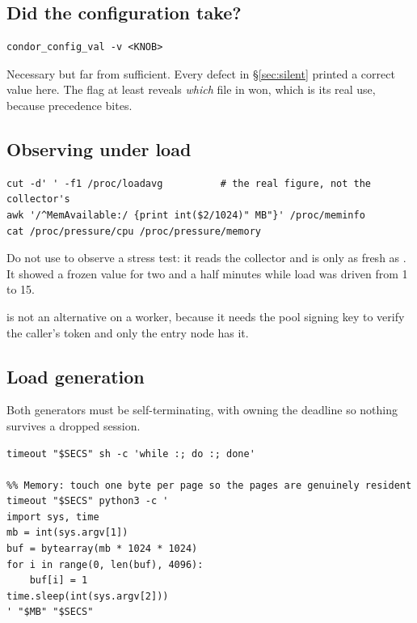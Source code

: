 \subsection{Did the configuration take?}

\begin{lstlisting}[style=term]
condor_config_val -v <KNOB>
\end{lstlisting}

\begin{trap}
Necessary but far from sufficient. Every defect in \S\ref{sec:silent}
printed a correct value here. The  flag at least reveals \emph{which} file
in  won, which is its real use, because precedence bites.
\end{trap}

\subsection{Observing under load}

\begin{lstlisting}[style=term]
cut -d' ' -f1 /proc/loadavg          # the real figure, not the collector's
awk '/^MemAvailable:/ {print int($2/1024)" MB"}' /proc/meminfo
cat /proc/pressure/cpu /proc/pressure/memory
\end{lstlisting}

\begin{trap}
Do not use  to observe a stress test: it reads the collector
and is only as fresh as . It showed a frozen value for two
and a half minutes while load was driven from 1 to 15.

 is not an alternative on a worker, because it needs
the pool signing key to verify the caller's token and only the entry node has
it.
\end{trap}

\subsection{Load generation}

Both generators must be self-terminating, with  owning the deadline
so nothing survives a dropped session.

\begin{lstlisting}[style=term]
%% CPU: tight loop, no fork per iteration
timeout "$SECS" sh -c 'while :; do :; done'

%% Memory: touch one byte per page so the pages are genuinely resident
timeout "$SECS" python3 -c '
import sys, time
mb = int(sys.argv[1])
buf = bytearray(mb * 1024 * 1024)
for i in range(0, len(buf), 4096):
    buf[i] = 1
time.sleep(int(sys.argv[2]))
' "$MB" "$SECS"
\end{lstlisting}

